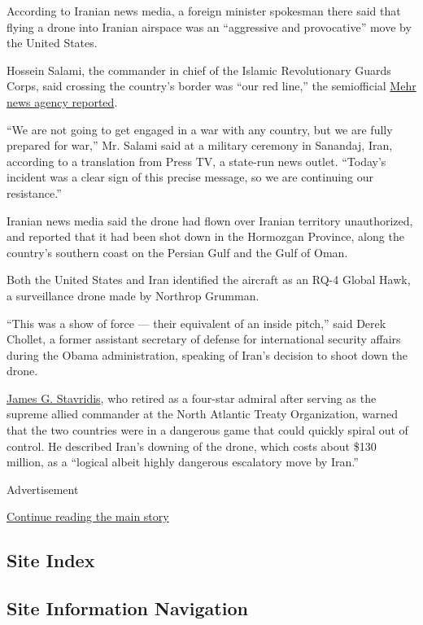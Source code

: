 According to Iranian news media, a foreign minister spokesman there said
that flying a drone into Iranian airspace was an ``aggressive and
provocative'' move by the United States.

Hossein Salami, the commander in chief of the Islamic Revolutionary
Guards Corps, said crossing the country's border was ``our red line,''
the semiofficial
\href{https://en.mehrnews.com/news/146678/IRGC-releases-details-of-downing-the-intruding-US-drone}{Mehr
news agency reported}.

``We are not going to get engaged in a war with any country, but we are
fully prepared for war,'' Mr. Salami said at a military ceremony in
Sanandaj, Iran, according to a translation from Press TV, a state-run
news outlet. ``Today's incident was a clear sign of this precise
message, so we are continuing our resistance.''

Iranian news media said the drone had flown over Iranian territory
unauthorized, and reported that it had been shot down in the Hormozgan
Province, along the country's southern coast on the Persian Gulf and the
Gulf of Oman.

Both the United States and Iran identified the aircraft as an RQ-4
Global Hawk, a surveillance drone made by Northrop Grumman.

``This was a show of force --- their equivalent of an inside pitch,''
said Derek Chollet, a former assistant secretary of defense for
international security affairs during the Obama administration, speaking
of Iran's decision to shoot down the drone.

\href{https://www.nytimes.com/2016/07/13/us/politics/james-stavridis-hillary-clinton-vice-president.html}{James
G. Stavridis}, who retired as a four-star admiral after serving as the
supreme allied commander at the North Atlantic Treaty Organization,
warned that the two countries were in a dangerous game that could
quickly spiral out of control. He described Iran's downing of the drone,
which costs about \$130 million, as a ``logical albeit highly dangerous
escalatory move by Iran.''

Advertisement

\protect\hyperlink{after-bottom}{Continue reading the main story}

\hypertarget{site-index}{%
\subsection{Site Index}\label{site-index}}

\hypertarget{site-information-navigation}{%
\subsection{Site Information
Navigation}\label{site-information-navigation}}

